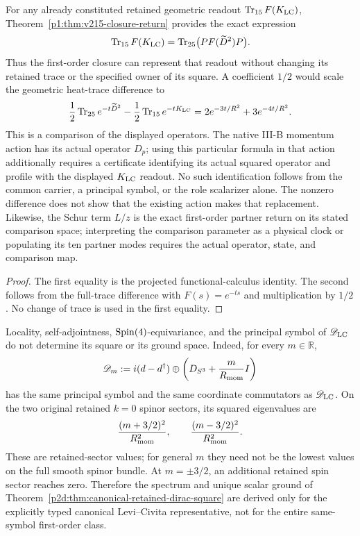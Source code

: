 \documentclass[12pt,a4paper]{article}
\begin{document}
\begin{corollary}
\label{p2d:cor:v215-closure-projected-readout}
For any already constituted retained geometric readout
\(\operatorname{Tr}_{15}F(K_{\rm LC})\),
Theorem~\ref{p1:thm:v215-closure-return} provides the exact expression
\[
 \operatorname{Tr}_{15}F(K_{\rm LC})
   =\operatorname{Tr}_{25}\bigl(PF(\widetilde D^2)P\bigr).
\]
Thus the first-order closure can represent that readout without changing
its retained trace or the specified owner of its square. A coefficient
\(1/2\) would scale the geometric heat-trace difference to
\[
 \frac12\operatorname{Tr}_{25}e^{-t\widetilde D^2}
 -\frac12\operatorname{Tr}_{15}e^{-tK_{\rm LC}}
       =2e^{-3t/R^2}+3e^{-4t/R^2}.
\]
This is a comparison of the displayed operators. The native III-B
momentum action has its actual operator \(D_p\); using this particular
formula in that action additionally requires a certificate identifying
its actual squared operator and profile with the displayed
\(K_{\rm LC}\) readout. No such identification follows from the
common carrier, a principal symbol, or the role scalarizer alone.
The nonzero difference does not show that the existing action makes
that replacement. Likewise,
the Schur term \(L/z\) is the exact first-order partner return on its
stated comparison space; interpreting the comparison parameter as a
physical clock or populating its ten partner modes requires the actual
operator, state, and comparison map.
\end{corollary}
\begin{proof}
The first equality is the projected functional-calculus identity. The
second follows from the full-trace difference with \(F(s)=e^{-ts}\)
and multiplication by \(1/2\). No change of trace is used in
the first equality.
\end{proof}


\begin{theorem}
\label{p2d:thm:same-symbol-zero-order-no-go}
Locality, self-adjointness, \(\mathrm{Spin}(4)\)-equivariance, and the principal symbol
of \(\mathscr D_{\rm LC}\) do not determine its square or its ground space.
Indeed, for every \(m\in\mathbb R\),
\[
 \mathscr D_m
 :=i(d-d^\dagger)\oplus
   \left(D_{S^3}+\frac{m}{R_{\mathrm{mom}}}I\right)
\]
has the same principal symbol and the same coordinate commutators as
\(\mathscr D_{\rm LC}\).  On the two original retained \(k=0\) spinor
sectors, its squared eigenvalues are
\[
 \frac{(m+3/2)^2}{R_{\mathrm{mom}}^2},\qquad
 \frac{(m-3/2)^2}{R_{\mathrm{mom}}^2}.
\]
These are retained-sector values; for general \(m\) they need not be the
lowest values on the full smooth spinor bundle.  At \(m=\pm3/2\), an
additional retained spin sector reaches zero.  Therefore
the spectrum and unique scalar ground of
Theorem~\ref{p2d:thm:canonical-retained-dirac-square} are derived only for the
explicitly typed canonical Levi--Civita representative, not for the entire
same-symbol first-order class.
\end{theorem}
\end{document}
